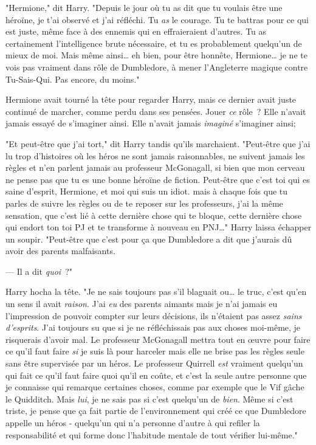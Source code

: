 "Hermione," dit Harry. "Depuis le jour où tu as dit que tu voulais être une héroïne, je t'ai observé et j'ai réfléchi. Tu \emph{as} le courage. Tu te battras pour ce qui est juste, même face à des ennemis qui en effraieraient d'autres. Tu as certainement l'intelligence brute nécessaire, et tu es probablement quelqu'un de mieux de moi. Mais même ainsi… eh bien, pour être honnête, Hermione… je ne te vois pas vraiment dans rôle de Dumbledore, à mener l'Angleterre magique contre Tu-Sais-Qui. Pas encore, du moins."

Hermione avait tourné la tête pour regarder Harry, mais ce dernier avait juste continué de marcher, comme perdu dans ses pensées. Jouer \emph{ce} rôle~? Elle n'avait jamais essayé de s'imaginer ainsi. Elle n'avait jamais \emph{imaginé} s'imaginer ainsi;

"Et peut-être que j'ai tort," dit Harry tandis qu'ils marchaient. "Peut-être que j'ai lu trop d'histoires où les héros ne sont jamais raisonnables, ne suivent jamais les règles et n'en parlent jamais au professeur McGonagall, si bien que mon cerveau ne pense pas que tu es une bonne héroïne de fiction. Peut-être que c'est toi qui es saine d'esprit, Hermione, et moi qui suis un idiot. mais à chaque fois que tu parles de suivre les règles ou de te reposer sur les professeurs, j'ai la même sensation, que c'est lié à cette dernière chose qui te bloque, cette dernière chose qui endort ton toi PJ et te transforme à nouveau en PNJ…" Harry laissa échapper un soupir. "Peut-être que c'est pour ça que Dumbledore a dit que j'aurais dû avoir des parents malfaisants.

--- Il a dit \emph{quoi}~?"

Harry hocha la tête. "Je ne sais toujours pas s'il blaguait ou… le truc, c'est qu'en un sens il avait \emph{raison}. J'ai \emph{eu} des parents aimants mais je n'ai jamais eu l'impression de pouvoir compter sur leurs décisions, ils n'étaient pas assez \emph{sains d'esprits}. J'ai toujours su que si je ne réfléchissais pas aux choses moi-même, je risquerais d'avoir mal. Le professeur McGonagall mettra tout en œuvre pour faire ce qu'il faut faire \emph{si} je suis là pour harceler mais elle ne brise pas les règles seule sans être supervisée par un héros. Le professeur Quirrell \emph{est} vraiment quelqu'un qui fait ce qu'il faut faire quoi qu'il en coûte, et c'est la seule autre personne que je connaisse qui remarque certaines choses, comme par exemple que le Vif gâche le Quidditch. Mais \emph{lui}, je ne sais pas si c'est quelqu'un de \emph{bien}. Même si c'est triste, je pense que ça fait partie de l'environnement qui créé ce que Dumbledore appelle un héros - quelqu'un qui n'a personne d'autre à qui refiler la responsabilité et qui forme donc l'habitude mentale de tout vérifier lui-même."


